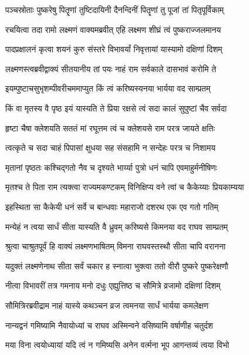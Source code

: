 \twolineshloka
{पञ्चस्रोताः पुष्करेषु पितॄणां तुष्टिदायिनी}
{दैनन्दिनीं पितॄणां तु पूजां तां पितृपूर्विकाम्} %

\twolineshloka
{रचयित्वा तदा रामो लक्ष्मणं वाक्यमब्रवीत्}
{एहि लक्ष्मण शीघ्रं त्वं पुष्कराज्जलमानय} %

\twolineshloka
{पादप्रक्षालनं कृत्वा शयनं कुरु संस्तरे}
{विभावर्यां निवृत्तायां यास्यामो दक्षिणां दिशम्} %

\twolineshloka
{लक्ष्मणस्त्वब्रवीद्वाक्यं सीतयानीय तां पयः}
{नाहं राम सर्वकाले दासभावं करोमि ते} %

\twolineshloka
{इयम्पुष्टाचसुभृशम्पीवरीचममाप्युत}
{किं त्वं करिष्यस्यनया भार्यया वद साम्प्रतम्} %

\twolineshloka
{किं वा मृतस्य वै पृष्ठ इयं यास्यति ते प्रिया}
{रक्षसे त्वं सदा कालं सुपुष्टां चैव सर्वदा} %

\twolineshloka
{हृष्टा चैषा क्लेशयति सततं मां रघूत्तम}
{त्वं च क्लेशयसे राम परत्र जायते क्षतिः} %

\twolineshloka
{त्वत्कृते च सदा चाहं पिपासां क्षुधया सह}
{संसहामि न सन्देहः परत्र च निशामय} %

\twolineshloka
{मृतानां पृष्ठतः कश्चिद्गतो नैव च दृश्यते}
{भार्य्या पुत्रो धनं चापि एवमाहुर्मनीषिणः} %

\twolineshloka
{मृतश्च ते पिता राम त्यक्त्वा राज्यमकण्टकम्}
{विनिक्षिप्य वने त्वां च कैकेय्याः प्रियकाम्यया} %

\twolineshloka
{इहस्थिता सा कैकेयी धनं सर्वे च बान्धवाः}
{महाराजो दशरथ एक एव गतो गतिम्} %

\twolineshloka
{मन्येहं न त्वया सार्धं सीता यास्यति वै ध्रुवम्}
{करिष्यसे किमनया वद राघव साम्प्रतम्} %

\twolineshloka
{श्रुत्वा चाश्रुतपूर्वं हि वाक्यं लक्ष्मणभाषितम्}
{विमना राघवस्तस्थौ सीता चापि वरानना} %

\twolineshloka
{यदुक्तं लक्ष्मणेनाथ सीता सर्वं चकार ह}
{स्नात्वा भुक्त्वा ततो वीरौ पुष्करे पुष्करेक्षणौ} %

\twolineshloka
{नीत्वा विभावरीं तत्र गमनाय मनो दधुः}
{एह्युत्तिष्ठ च सौमित्रे व्रजामो दक्षिणां दिशम्} %

\twolineshloka
{सौमित्रिरब्रवीद्राम नाहं यास्ये कथञ्चन}
{व्रज त्वमनया सार्धं भार्यया कमलेक्षण} %

\twolineshloka
{नान्यद्वनं गमिष्यामि नैवायोध्यां च राघव}
{अस्मिन्वने वसिष्यामि वर्षाणीह चतुर्दश} %

\twolineshloka
{मया विना त्वयोध्यायां यदि त्वं न गमिष्यसि}
{अनेन वर्त्मना भूप आगन्तव्यं त्वया विभो} %

